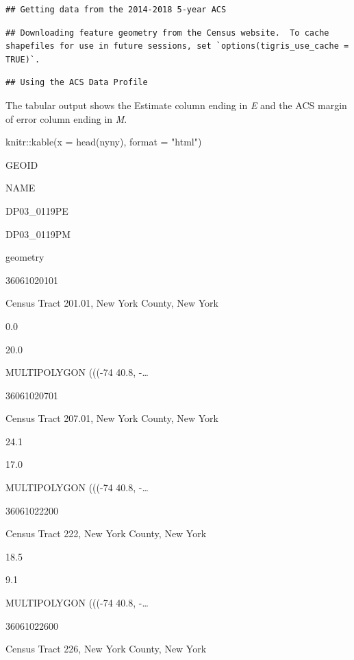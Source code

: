 \documentclass[
]{article}
\newenvironment{Shaded}{\begin{snugshade}}{\end{snugshade}}
\newcommand{\AttributeTok}[1]{\textcolor[rgb]{0.77,0.63,0.00}{#1}}
\newcommand{\FunctionTok}[1]{\textcolor[rgb]{0.00,0.00,0.00}{#1}}
\newcommand{\NormalTok}[1]{#1}
\newcommand{\SpecialCharTok}[1]{\textcolor[rgb]{0.00,0.00,0.00}{#1}}
\newcommand{\StringTok}[1]{\textcolor[rgb]{0.31,0.60,0.02}{#1}}
\begin{document}
\begin{verbatim}
## Getting data from the 2014-2018 5-year ACS
\end{verbatim}

\begin{verbatim}
## Downloading feature geometry from the Census website.  To cache shapefiles for use in future sessions, set `options(tigris_use_cache = TRUE)`.
\end{verbatim}

\begin{verbatim}
## Using the ACS Data Profile
\end{verbatim}

The tabular output shows the Estimate column ending in \emph{E} and the ACS margin of error column ending in \emph{M}.

\begin{Shaded}
\begin{Highlighting}[]
\NormalTok{knitr}\SpecialCharTok{::}\FunctionTok{kable}\NormalTok{(}\AttributeTok{x =} \FunctionTok{head}\NormalTok{(nyny),}
             \AttributeTok{format =} \StringTok{"html"}\NormalTok{)}
\end{Highlighting}
\end{Shaded}

GEOID

NAME

DP03\_0119PE

DP03\_0119PM

geometry

36061020101

Census Tract 201.01, New York County, New York

0.0

20.0

MULTIPOLYGON (((-74 40.8, -\ldots{}

36061020701

Census Tract 207.01, New York County, New York

24.1

17.0

MULTIPOLYGON (((-74 40.8, -\ldots{}

36061022200

Census Tract 222, New York County, New York

18.5

9.1

MULTIPOLYGON (((-74 40.8, -\ldots{}

36061022600

Census Tract 226, New York County, New York
\end{document}
